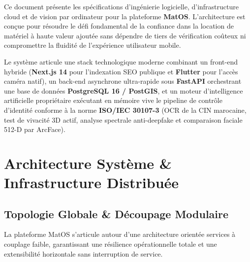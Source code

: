 \documentclass[11pt,a4paper]{report}
\begin{document}
\begin{tcolorbox}[execbox]
Ce document présente les spécifications d'ingénierie logicielle, d'infrastructure cloud et de vision par ordinateur pour la plateforme \textbf{MatOS}. L'architecture est conçue pour résoudre le défi fondamental de la confiance dans la location de matériel à haute valeur ajoutée sans dépendre de tiers de vérification coûteux ni compromettre la fluidité de l'expérience utilisateur mobile.

Le système articule une stack technologique moderne combinant un front-end hybride (\textbf{Next.js 14} pour l'indexation SEO publique et \textbf{Flutter} pour l'accès caméra natif), un back-end asynchrone ultra-rapide sous \textbf{FastAPI} orchestrant une base de données \textbf{PostgreSQL 16 / PostGIS}, et un moteur d'intelligence artificielle propriétaire exécutant en mémoire vive le pipeline de contrôle d'identité conforme à la norme \textbf{ISO/IEC 30107-3} (OCR de la CIN marocaine, test de vivacité 3D actif, analyse spectrale anti-deepfake et comparaison faciale 512-D par ArcFace).
\end{tcolorbox}

\chapter{Architecture Système \& Infrastructure Distribuée}

\section{Topologie Globale \& Découpage Modulaire}
La plateforme MatOS s'articule autour d'une architecture orientée services à couplage faible, garantissant une résilience opérationnelle totale et une extensibilité horizontale sans interruption de service.
\end{document}
